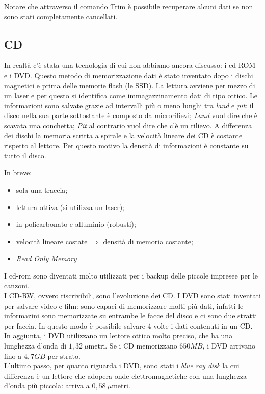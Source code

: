\documentclass{article}
\begin{document}
Notare che attraverso il comando Trim è possibile recuperare alcuni dati se non sono stati completamente cancellati.

\subsection{CD}

In realtà c'è stata una tecnologia di cui non abbiamo ancora discusso: i cd ROM e i DVD.
Questo metodo di memorizzazione dati è stato inventato dopo i dischi magnetici e prima delle memorie flash (le SSD).
La lettura avviene per mezzo di un laser e per questo si identifica come immagazzinamento dati di tipo ottico.
Le informazioni sono salvate grazie ad intervalli più o meno lunghi tra \textit{land} e \textit{pit}: il disco nella sua parte sottostante è composto da microrilievi; \textit{Land} vuol dire che è scavata una conchetta; \textit{Pit} al contrario vuol dire che c'è un rilievo. A differenza dei dischi la memoria scritta a spirale e la velocità lineare dei CD è costante rispetto al lettore. Per questo motivo la densità di informazioni è constante su tutto il disco.

In breve:
\begin{itemize}
	\item sola una traccia;
	\item lettura ottiva (si utilizza un laser);
	\item in policarbonato e alluminio (robusti);
	\item velocità lineare costate $\Rightarrow$ densità di memoria costante;
	\item \textit{Read Only Memory}
\end{itemize}

I cd-rom sono diventati molto utilizzati per i backup delle piccole impresee per le canzoni.\\

I CD-RW, ovvero riscrivibili, sono l'evoluzione dei CD. I DVD sono stati inventati per salvare video e film: sono capaci di memorizzare molti più dati, infatti le informazini sono memorizzate su entrambe le facce del disco e ci sono due stratti per faccia. In questo modo è possibile salvare 4 volte i dati contenuti in un CD. In aggiunta, i DVD utilizzano un lettore ottico molto preciso, che ha una lunghezza d'onda di $1,32 \ \mu$metri. Se i CD memorizzano $ 650 MB$, i DVD arrivano fino a $4,7 GB$ per strato.\\
L'ultimo passo, per quanto riguarda i DVD, sono stati i \textit{blue ray disk} la cui differenza è un lettore che adopera onde elettromagnetiche con una lunghezza d'onda più piccola: arriva a $0,58 \ \mu$metri.
\end{document}
